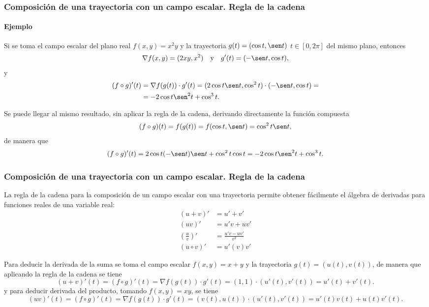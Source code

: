 \begin{frame}
\frametitle{Composición de una trayectoria con un campo escalar. Regla de la cadena}
\framesubtitle{Ejemplo}
Si se toma el campo escalar del plano real $f(x,y)=x^2y$ y la trayectoria $g(t)=(\cos t,\sen t)$ $t\in [0,2\pi]$ del mismo plano, entonces
\[
\nabla f(x,y) = (2xy, x^2) \quad  \mbox{y} \quad g'(t) = (-\sen t, \cos t),
\]
y 
\begin{align*}
(f\circ g)'(t) &= \nabla f(g(t))\cdot g'(t) = (2\cos t\sen t,\cos^2 t)\cdot (-\sen t,\cos t) =\\
&= -2\cos t\sen^2 t+\cos^3 t.
\end{align*}

Se puede llegar al mismo resultado, sin aplicar la regla de la cadena, derivando directamente la función compuesta
\[
(f\circ g)(t) = f(g(t)) = f(\cos t, \sen t) = \cos^2 t\sen t,
\]
de manera que
\[
(f\circ g)'(t) = 2\cos t(-\sen t)\sen t+\cos^2 t \cos t = -2\cos t\sen^2 t+\cos^3 t.
\]
\end{frame}


\begin{frame}
\frametitle{Composición de una trayectoria con un campo escalar. Regla de la cadena}
La regla de la cadena para la composición de un campo escalar con una trayectoria permite obtener fácilmente el álgebra de derivadas para funciones reales de una variable real:
\begin{align*}
(u+v)' &= u'+v'\\
(uv)' &= u'v+uv'\\
\left(\frac{u}{v}\right)' &= \frac{u'v-uv'}{v^2}\\
(u\circ v)' &= u'(v)v'
\end{align*}

Para deducir la derivada de la suma se toma el campo escalar $f(x,y)=x+y$ y la trayectoria $g(t)=(u(t),v(t))$, de manera que aplicando la regla de la cadena se tiene
\[
(u+v)'(t) = (f\circ g)'(t) = \nabla f(g(t))\cdot g'(t) = (1,1)\cdot (u'(t),v'(t)) = u'(t)+v'(t).
\]
y para deducir derivada del producto, tomando $f(x,y)=xy$, se tiene
\[
(uv)'(t) = (f\circ g)'(t) = \nabla f(g(t))\cdot g'(t) = (v(t),u(t))\cdot (u'(t),v'(t)) = u'(t)v(t)+u(t)v'(t).
\]
\end{frame}



